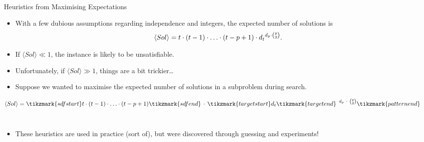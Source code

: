 \documentclass{beamer}
\begin{document}
\begin{frame}{Heuristics from Maximising Expectations}

     {
        \begin{itemize}
            \item With a few dubious assumptions regarding independence and integers, the expected
                number of solutions is \[ \langle Sol \rangle = t \cdot (t - 1) \cdot \ldots
                        \cdot (t - p + 1) \cdot {d_t}^{d_p \cdot \binom{p}{2}} \textnormal{.} \]
            \item If $\langle Sol \rangle \ll 1$, the instance is likely to be unsatisfiable.
            \item Unfortunately, if $\langle Sol \rangle \gg 1$, things are a bit trickier\ldots
        \end{itemize}
    }

     {
        
    }

     {
        \begin{itemize}
            \item Suppose we wanted to maximise the expected number of solutions in a subproblem during
                search. \\[0.3cm]

        \end{itemize}
        {\Large \[ \langle Sol \rangle = \tikzmark{sdfstart}t \cdot (t - 1) \cdot \ldots \cdot (t -
                p + 1)\tikzmark{sdfend} \, \cdot \,
                {\tikzmark{targetstart}d_t\tikzmark{targetend}
                ~}^{\, d_p ~ \cdot ~ \binom{p}{2}}\tikzmark{patternend}
        \] \\[0.5cm]}


        \begin{itemize}
            \item These heuristics are used in practice (sort of), but were discovered through
                guessing and experiments!
        \end{itemize}
    }

\end{frame}
\end{document}
